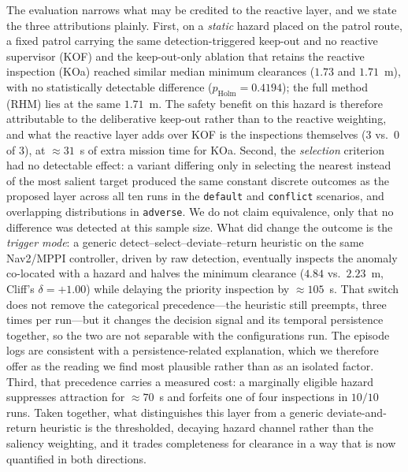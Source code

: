 The evaluation narrows what may be credited to the reactive layer, and we state the
three attributions plainly. First, on a \emph{static} hazard placed on the patrol
route, a fixed patrol carrying the same detection-triggered keep-out and no
reactive supervisor (KOF) and the keep-out-only ablation that retains the reactive
inspection (KOa) reached similar median minimum clearances ($1.73$ and $1.71$~m),
with no statistically detectable difference ($p_{\mathrm{Holm}}=0.4194$); the full
method (RHM) lies at the same $1.71$~m. The safety benefit on this hazard is
therefore attributable to the deliberative keep-out rather than to the reactive
weighting, and what the reactive layer adds over KOF is the inspections themselves
($3$ vs.\ $0$ of $3$), at ${\approx}31$~s of extra mission time for KOa.
Second, the \emph{selection} criterion had no detectable effect: a variant differing
only in selecting the nearest instead of the most salient target produced the same
constant discrete outcomes as the proposed layer across all ten runs in the
\texttt{default} and \texttt{conflict} scenarios, and overlapping distributions in
\texttt{adverse}. We do not claim equivalence, only that no difference was detected at
this sample size. What did change the outcome is the \emph{trigger mode}: a generic
detect--select--deviate--return heuristic on the same Nav2/MPPI controller, driven by
raw detection, eventually inspects the anomaly co-located with a hazard and halves the
minimum clearance ($4.84$ vs.\ $2.23$~m, Cliff's $\delta=+1.00$) while delaying the
priority inspection by ${\approx}105$~s. That switch does not remove the categorical
precedence---the heuristic still preempts, three times per run---but it changes the
decision signal and its temporal persistence together, so the two are not separable
with the configurations run. The episode logs are consistent with a
persistence-related explanation, which we therefore offer as the reading we find most
plausible rather than as an isolated factor. Third, that precedence carries a measured
cost: a marginally eligible hazard suppresses attraction for ${\approx}70$~s and
forfeits one of four inspections in $10/10$ runs. Taken together, what distinguishes
this layer from a generic deviate-and-return heuristic is the thresholded, decaying
hazard channel rather than the saliency weighting, and it trades completeness for
clearance in a way that is now quantified in both directions.

